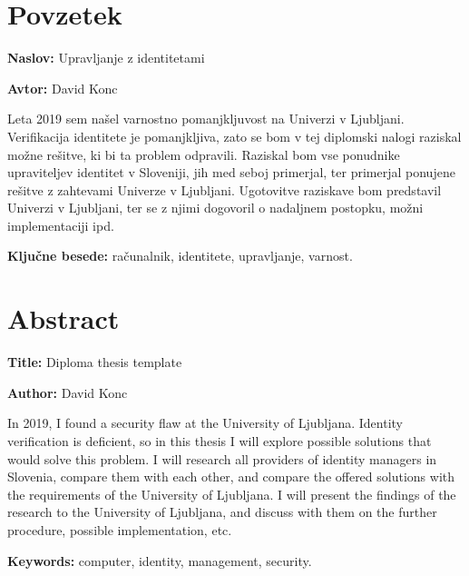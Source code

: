 \documentclass[a4paper,12pt,openright]{book}
\newcommand{\ttitle}{Upravljanje z identitetami}
\newcommand{\ttitleEn}{Diploma thesis template}
\newcommand{\tauthor}{David Konc}
\newcommand{\tkeywords}{računalnik, identitete, upravljanje, varnost}
\newcommand{\tkeywordsEn}{computer, identity, management, security}
\newcommand{\clearemptydoublepage}{\newpage{\pagestyle{empty}\cleardoublepage}}
\begin{document}
\chapter*{Povzetek}

\noindent\textbf{Naslov:} \ttitle
\bigskip

\noindent\textbf{Avtor:} \tauthor
\bigskip

\noindent Leta 2019 sem našel varnostno pomanjkljuvost na Univerzi v Ljubljani. Verifikacija identitete je pomanjkljiva, zato se bom v tej diplomski nalogi raziskal možne rešitve, ki bi ta problem odpravili. Raziskal bom vse ponudnike upraviteljev identitet v Sloveniji, jih med seboj primerjal, ter primerjal ponujene rešitve z zahtevami Univerze v Ljubljani. Ugotovitve raziskave bom predstavil Univerzi v Ljubljani, ter se z njimi dogovoril o nadaljnem postopku, možni implementaciji ipd. 
\bigskip

\noindent\textbf{Ključne besede:} \tkeywords.
\clearemptydoublepage

\chapter*{Abstract}

\noindent\textbf{Title:} \ttitleEn
\bigskip

\noindent\textbf{Author:} \tauthor
\bigskip

\noindent In 2019, I found a security flaw at the University of Ljubljana. Identity verification is deficient, so in this thesis I will explore possible solutions that would solve this problem. I will research all providers of identity managers in Slovenia, compare them with each other, and compare the offered solutions with the requirements of the University of Ljubljana. I will present the findings of the research to the University of Ljubljana, and discuss with them on the further procedure, possible implementation, etc.


\bigskip

\noindent\textbf{Keywords:} \tkeywordsEn.
\clearemptydoublepage

\mainmatter
\setcounter{page}{1}
\pagestyle{fancy}
\end{document}
